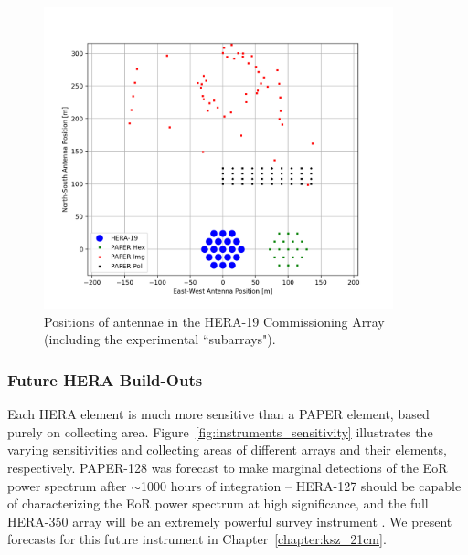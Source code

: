\begin{figure}
\centering
\includegraphics[width=0.9\textwidth]{chapters/instruments/figures/h19layout.png}
\caption{Positions of antennae in the HERA-19 Commissioning Array (including the experimental ``subarrays").}
\label{fig:instruments_hera19_layout}
\end{figure}

\subsubsection{Future HERA Build-Outs}

Each HERA element is much more sensitive than a PAPER element, based purely on collecting area. Figure~\ref{fig:instruments_sensitivity} illustrates the varying sensitivities and collecting areas of different arrays and their elements, respectively. PAPER-128 was forecast to make marginal detections of the EoR power spectrum after $\sim$1000 hours of integration -- HERA-127 should be capable of characterizing the EoR power spectrum at high significance, and the full HERA-350 array will be an extremely powerful survey instrument \citep[e.g.][]{PoberMemo}. We present forecasts for this future instrument in Chapter~\ref{chapter:ksz_21cm}.

